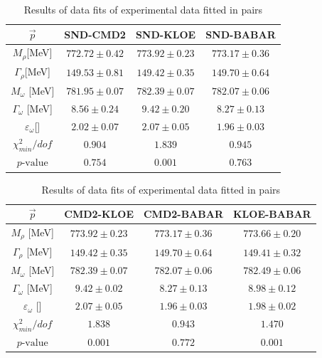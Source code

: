 \documentclass[a4paper]{article}
\begin{document}
\begin{table}[h!]
    \caption{Results of data fits of experimental data fitted in pairs}
    \centering
    \begin{tabular}{|c|c|c|c|}
        \hline
        $\vec{p}$ & SND-CMD2 & SND-KLOE & SND-BABAR  \\ \hline
        $M_{\rho}$[MeV]              & $772.72	\pm 0.42$ & $773.92	\pm 0.23$ &$773.17	\pm 0.36 $ \\
        $\Gamma_{\rho}$[MeV]         & $149.53	\pm 0.81$ & $149.42	\pm 0.35$ &$149.70	\pm 0.64 $\\
        $M_{\omega}$  [MeV]          & $781.95	\pm 0.07$ & $782.39	\pm 0.07$ &$782.07	\pm 0.06 $\\
        $\Gamma_{\omega}$ [MeV]      & $8.56	\pm 0.24    $ & $9.42	\pm 0.20$ &$8.27	\pm 0.13 $\\
        $\varepsilon_{\omega}$[]  & $2.02	\pm 0.07    $ & $2.07	\pm 0.05$ &$1.96	\pm 0.03 $\\
        \hline \hline
        $\chi^2_{min}/dof$      & $0.904$&$ 1.839$&$ 0.945$\\
        $p\text{-value}$        & $0.754$&$ 0.001$&$ 0.763$\\
        \hline

    \end{tabular}
\end{table}


\begin{table}[h!]
    \caption{Results of data fits of experimental data fitted in pairs}
    \centering
    \begin{tabular}{|c|c|c|c|}
        \hline
        $\vec{p}$ & CMD2-KLOE & CMD2-BABAR & KLOE-BABAR  \\ \hline
        $M_{\rho}$        [MeV]      & $773.92	\pm 0.23$ & $773.17	\pm 0.36$ &$773.66	\pm 0.20 $ \\
        $\Gamma_{\rho}$     [MeV]    & $149.42	\pm 0.35$ & $149.70	\pm 0.64$ &$149.41	\pm 0.32 $\\
        $M_{\omega}$         [MeV]   & $782.39	\pm 0.07$ & $782.07	\pm 0.06$ &$782.49	\pm 0.06 $\\
        $\Gamma_{\omega}$    [MeV]   & $9.42	\pm 0.02    $ & $8.27	\pm 0.13$ &$8.98	\pm 0.12 $\\
        $\varepsilon_{\omega}$ [] & $2.07	\pm 0.05    $ & $1.96	\pm 0.03$ &$1.98	\pm 0.02 $\\
        \hline \hline
        $\chi^2_{min}/dof$      & $1.838$&$ 0.943$&$ 1.470$\\
        $p\text{-value}$        & $0.001$&$ 0.772$&$ 0.001$\\
        \hline

    \end{tabular}
\end{table}
\end{document}
